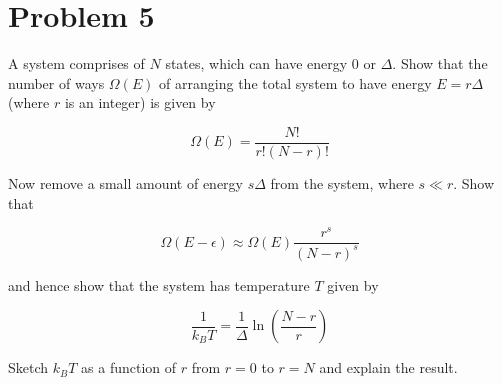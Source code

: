 \documentclass{article}
\begin{document}
\pagebreak
\section*{Problem 5}
A system comprises of $N$ states, which can have energy $0$ or $\Delta$. Show that the number of ways $\Omega(E)$ of arranging the total system to have energy $E = r\Delta$ (where $r$ is an integer) is given by 

\[ \Omega(E) = \frac{N!}{r!(N - r)!}\] 

Now remove a small amount of energy $s\Delta$ from the system, where $s \ll r$. Show that 

\[ \Omega(E - \epsilon) \approx \Omega(E) \frac{r^s}{(N - r)^s}\]

and hence show that the system has temperature $T$ given by 

\[ \frac{1}{k_BT} = \frac{1}{\Delta} \ln \left( \frac{N - r}{r}\right)\]

Sketch $k_BT$ as a function of $r$ from $r = 0$ to $r = N$ and explain the result.
\end{document}
